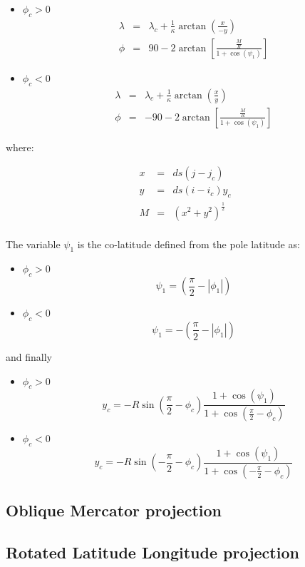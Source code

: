 \begin{itemize}
  \item $\phi_c > 0$
    \begin{eqnarray}
      \lambda &=& \lambda_c + 
         \frac{1}{\kappa}\arctan\left(\frac{x}{-y}\right) \\
      \phi &=& 90 - 2 \arctan\left[\frac{\frac{M}{R}}{1+\cos(\psi_1)}\right]
    \end{eqnarray}
  \item $\phi_c < 0$
    \begin{eqnarray}
      \lambda &=& \lambda_c + 
         \frac{1}{\kappa} \arctan \left(\frac{x}{y}\right) \\
      \phi &=& -90 - 2 \arctan\left[\frac{\frac{M}{R}}{1+\cos(\psi_1)}\right]
    \end{eqnarray}
\end{itemize}

where:

\begin{eqnarray}
  x &=& ds \left(j-j_c\right) \\
  y &=& ds \left(i-i_c\right) y_c\\
  M &=& \left(x^2+y^2\right)^{\frac{1}{2}} \\
\end{eqnarray}

The variable $\psi_1$ is the co-latitude defined from the pole latitude as:

\begin{itemize}
  \item $\phi_c > 0$
    \begin{equation}
      \psi_1 = \left(\frac{\pi}{2} - |\phi_1| \right)
    \end{equation}
  \item $\phi_c < 0$
    \begin{equation}
      \psi_1 = -\left(\frac{\pi}{2} - |\phi_1| \right)
    \end{equation}
\end{itemize}

and finally

\begin{itemize}
  \item $\phi_c > 0$
    \begin{equation}
      y_c = -R \sin \left(\frac{\pi}{2} - \phi_c\right)
        \frac{1+\cos(\psi_1)}{1+\cos\left(\frac{\pi}{2}-\phi_c\right)}
    \end{equation}
  \item $\phi_c < 0$
    \begin{equation}
      y_c = -R \sin \left(-\frac{\pi}{2} - \phi_c\right)
        \frac{1+\cos(\psi_1)}{1+\cos\left(-\frac{\pi}{2}-\phi_c\right)}
    \end{equation}
\end{itemize}

\subsection{Oblique Mercator projection}

\subsection{Rotated Latitude Longitude projection}

